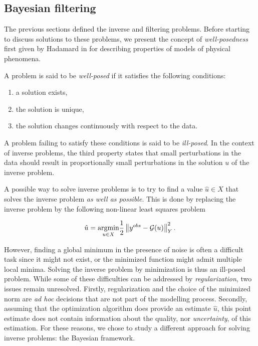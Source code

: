 \subsection{Bayesian filtering}

The previous sections defined the inverse and filtering problems. Before starting to discuss solutions to these problems, we present the concept of \textit{well-posedness} first given by Hadamard in \cite{hadamard} for describing properties of models of physical phenomena.

\begin{definition} A problem is said to be \textit{well-posed} if it satisfies the following conditions:
  \begin{enumerate}
  \item{a solution exists,}
  \item{the solution is unique,}
  \item{the solution changes continuously with respect to the data.}
  \end{enumerate}

  A problem failing to satisfy these conditions is said to be \textit{ill-posed}. In the context of inverse problems, the third property states that small perturbations in the data should result in proportionally small perturbations in the solution $u$ of the inverse problem. 
\end{definition}

A possible way to solve inverse problems is to try to find a value $\hat u \in X$ that solves the inverse problem \textit{as well as possible}. This is done by replacing the inverse problem by the following non-linear least squares problem

\begin{equation*}
  \hat u = \underset{u \in X}{\text{argmin}} \frac12\left\lVert y^{obs} - \mathcal{G}(u) \right\rVert_Y^2.
\end{equation*}

However, finding a global minimum in the presence of noise is often a difficult task since it might not exist, or the minimized function might admit multiple local minima. Solving the inverse problem by minimization is thus an ill-posed problem. While some of these difficulties can be addressed by \textit{regularization}, two issues remain unresolved. Firstly, regularization and the choice of the minimized norm are \textit{ad hoc} decisions that are not part of the modelling process. Secondly, assuming that the optimization algorithm does provide an estimate $\hat u$, this point estimate does not contain information about the quality, nor \textit{uncertainty}, of this estimation. For these reasons, we chose to study a different approach for solving inverse problems: the Bayesian framework.

